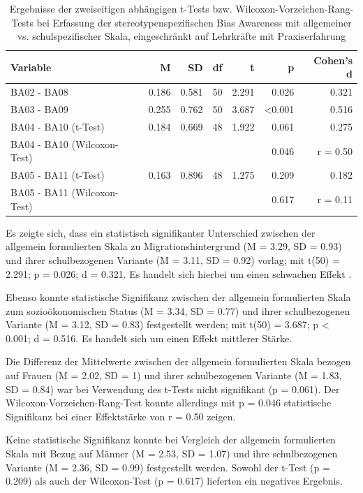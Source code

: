 \begin{table}[h!]
	\begin{tabularx}{\textwidth}{X | r | r | r | r | r | r}
		\hline
		Variable & M & SD & df & t & p & Cohen's d\\
		\hline
		BA02 - BA08 & 0.186 & 0.581 & 50 & 2.291 & 0.026 & 0.321\\
		BA03 - BA09 & 0.255 & 0.762 & 50 & 3.687 & <0.001 & 0.516\\
		BA04 - BA10 (t-Test) & 0.184 & 0.669 & 48 & 1.922 & 0.061 & 0.275\\
		BA04 - BA10 (Wilcoxon-Test) & & & & & 0.046 & r = 0.50\\
		BA05 - BA11 (t-Test) & 0.163 & 0.896 & 48 & 1.275 & 0.209 & 0.182\\
		BA05 - BA11 (Wilcoxon-Test) & & & & & 0.617 & r = 0.11\\
		\hline
	\end{tabularx}
	\caption{Ergebnisse der zweiseitigen abhängigen t-Tests bzw. Wilcoxon-Vorzeichen-Rang-Tests bei Erfassung der stereotypenspezifischen Bias Awareness mit allgemeiner vs. schulspezifischer Skala, eingeschränkt auf Lehrkräfte mit Praxiserfahrung}
	\label{tab:t-tests-stereotypen-lehrkraefte}
\end{table}

Es zeigte sich, dass ein statistisch signifikanter Unterschied zwischen der allgemein formulierten Skala zu Migrationshintergrund (M = 3.29, SD = 0.93) und ihrer schulbezogenen Variante (M = 3.11, SD = 0.92) vorlag; mit t(50) = 2.291; p = 0.026; d = 0.321.
Es handelt sich hierbei um einen schwachen Effekt \citep{cohen1992power}.

Ebenso konnte statistische Signifikanz zwischen der allgemein formulierten Skala zum sozioökonomischen Status (M = 3.34, SD = 0.77) und ihrer schulbezogenen Variante (M = 3.12, SD = 0.83) festgestellt werden; mit t(50) = 3.687; p < 0.001; d = 0.516.
Es handelt sich um einen Effekt mittlerer Stärke.

Die Differenz der Mittelwerte zwischen der allgemein formulierten Skala bezogen auf Frauen (M = 2.02, SD = 1) und ihrer schulbezogenen Variante (M = 1.83, SD = 0.84) war bei Verwendung des t-Tests nicht signifikant (p = 0.061).
Der Wilcoxon-Vorzeichen-Rang-Test konnte allerdings mit p = 0.046 statistische Signifikanz bei einer Effektstärke von r = 0.50 zeigen.

Keine statistische Signifikanz konnte bei Vergleich der allgemein formulierten Skala mit Bezug auf Männer (M = 2.53, SD = 1.07) und ihre schulbezogenen Variante (M = 2.36, SD = 0.99) festgestellt werden.
Sowohl der t-Test (p = 0.209) als auch der Wilcoxon-Test (p = 0.617) lieferten ein negatives Ergebnis.


